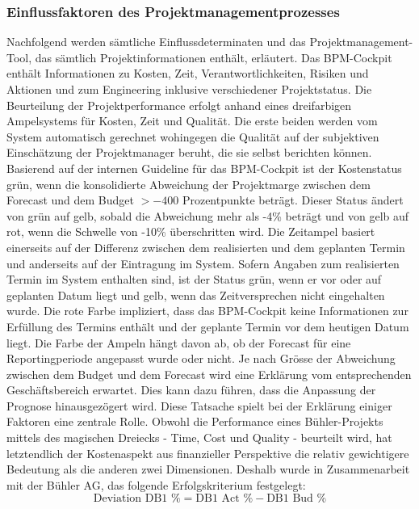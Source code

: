\subsubsection{Einflussfaktoren des Projektmanagementprozesses}\label{zweizwei}
Nachfolgend werden sämtliche Einflussdeterminaten und das Projektmanagement-Tool, das sämtlich Projektinformationen enthält, erläutert.
\newline
Das BPM-Cockpit enthält Informationen zu Kosten, Zeit, Verantwortlichkeiten, Risiken und Aktionen und zum Engineering inklusive verschiedener Projektstatus. Die Beurteilung der Projektperformance erfolgt anhand eines dreifarbigen Ampelsystems für Kosten, Zeit und Qualität. Die erste beiden werden vom System automatisch gerechnet wohingegen die Qualität auf der subjektiven Einschätzung der Projektmanager beruht, die sie selbst berichten können. Basierend auf der internen Guideline für das BPM-Cockpit ist der Kostenstatus grün, wenn die konsolidierte Abweichung der Projektmarge zwischen dem Forecast und dem Budget $> -400$ Prozentpunkte beträgt. Dieser Status ändert von grün auf gelb, sobald die Abweichung mehr als -4\% beträgt und von gelb auf rot, wenn die Schwelle von -10\% überschritten wird. Die Zeitampel basiert einerseits auf der Differenz zwischen dem realisierten und dem geplanten Termin und anderseits auf der Eintragung im System. Sofern Angaben zum realisierten Termin im System enthalten sind, ist der Status grün, wenn er vor oder auf geplanten Datum liegt und gelb, wenn das Zeitversprechen nicht eingehalten wurde. Die rote Farbe impliziert, dass das BPM-Cockpit keine Informationen zur Erfüllung des Termins enthält und der geplante Termin vor dem heutigen Datum liegt. Die Farbe der Ampeln hängt davon ab, ob der Forecast für eine Reportingperiode angepasst wurde oder nicht. Je nach Grösse der Abweichung zwischen dem Budget und dem Forecast wird eine Erklärung vom entsprechenden Geschäftsbereich erwartet. Dies kann dazu führen, dass die Anpassung der Prognose hinausgezögert wird. Diese Tatsache spielt bei der Erklärung einiger Faktoren eine zentrale Rolle.
\newline
Obwohl die Performance eines Bühler-Projekts mittels des magischen Dreiecks - Time, Cost und Quality - beurteilt wird, hat letztendlich der Kostenaspekt aus finanzieller Perspektive die relativ gewichtigere Bedeutung als die anderen zwei Dimensionen. Deshalb wurde in Zusammenarbeit mit der Bühler AG, das folgende Erfolgskriterium festgelegt:
\begin{equation}
	\text{Deviation DB1 \%} = \text{DB1 Act \%} - \text{DB1 Bud \%}
\end{equation}

